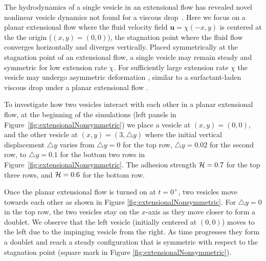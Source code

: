 \documentclass[prf,superscriptaddress,showkeys,longbibliography]{revtex4-1}
\newcommand{\uu}{\mathbf{u}}
\begin{document}
The hydrodynamics of a single vesicle in an extensional flow has
revealed novel nonlinear vesicle dynamics not found for a viscous
drop~\cite{KantslerSegreSteinberg2008_PRL, ZhaoShaqfeh2013_JFM,
Narsimhan2014_JFM, DahlNarsimhanGouveia2016_SoftMatt}.  Here we focus on a
planar extensional flow  where the fluid velocity field $\uu=\chi(-x,y)$ is centered at the 
the origin ($(x,y)=(0,0)$), the stagnation point where the fluid flow converges horizontally and diverges vertically.
Placed symmetrically at the stagnation point of an extensional flow,
a single vesicle may remain steady and symmetric for low extension rate $\chi$.
For sufficiently large extension rate $\chi$ the vesicle may undergo asymmetric deformation \cite{KantslerSegreSteinberg2008_PRL,Narsimhan2014_JFM,DahlNarsimhanGouveia2016_SoftMatt}, 
similar to a surfactant-laden viscous drop under a planar extensional flow \cite{JanssenBoonAgterof1997_AIChE,HuPineLeal2000_PoF}.

To investigate how two vesicles interact with each other in a planar extensional flow,
at the beginning of the simulations (left panels in Figure~\ref{fig:extensionalNonsymmetric})
we place a vesicle at $(x,y)=(0,0)$, 
and the other vesicle at $(x,y) = (3,\triangle y)$ where the initial vertical displacement $\triangle y$ varies from
$\triangle y=0$ for the top row, $\triangle y = 0.02$ for the second row, to
$\triangle y =0.1$ for the bottom two rows in Figure~\ref{fig:extensionalNonsymmetric}.
The adhesion strength ${\cal H} = 0.7$ for the top three rows, and ${\cal H} =0.6$ for the bottom row.

Once the planar extensional flow is turned on at $t=0^+$, two vesicles move
towards each other  as shown in  Figure \ref{fig:extensionalNonsymmetric}.
For $\triangle y=0$ in the top row, the two vesicles stay on the $x$-axis as they move closer to 
form a doublet. We observe that the left vesicle (initially centered at $(0,0)$) moves to the left due to the impinging
vesicle from the right. As time progresses they form a doublet
and reach a steady configuration that is symmetric with respect to the stagnation point 
(square mark in Figure \ref{fig:extensionalNonsymmetric}).
\end{document}
